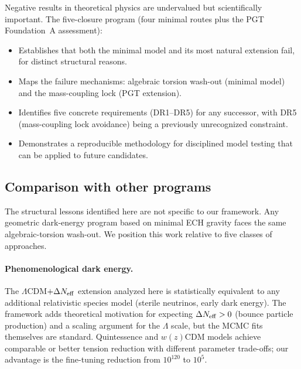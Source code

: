 \documentclass[aps,prd,twocolumn,superscriptaddress,showpacs,preprintnumbers,
  nofootinbib,longbibliography,floatfix]{revtex4-2}
\newcommand{\Neff}{N_{\rm eff}}
\begin{document}
Negative results in theoretical physics are undervalued but scientifically
important. The five-closure program (four minimal routes plus the PGT
Foundation~A assessment):
\begin{itemize}[leftmargin=*]
  \item Establishes that both the minimal model and its most natural
    extension fail, for distinct structural reasons.
  \item Maps the failure mechanisms: algebraic torsion wash-out
    (minimal model) and the mass-coupling lock (PGT extension).
  \item Identifies five concrete requirements (DR1--DR5) for any
    successor, with DR5 (mass-coupling lock avoidance) being a
    previously unrecognized constraint.
  \item Demonstrates a reproducible methodology for disciplined model
    testing that can be applied to future candidates.
\end{itemize}

\subsection{Comparison with other programs}\label{sec:related}

The structural lessons identified here are not specific to our framework.
Any geometric dark-energy program based on minimal ECH gravity faces the
same algebraic-torsion wash-out. We position this work relative to five
classes of approaches.

\paragraph{Phenomenological dark energy.}
The $\Lambda$CDM$+\Delta\Neff$ extension analyzed here is statistically
equivalent to any additional relativistic species model (sterile
neutrinos, early dark energy). The framework adds theoretical
motivation for expecting $\Delta\Neff > 0$ (bounce particle production)
and a scaling argument for the $\Lambda$ scale, but the MCMC fits
themselves are standard. Quintessence and $w(z)$CDM models achieve
comparable or better tension reduction with different parameter
trade-offs; our advantage is the fine-tuning reduction from $10^{120}$
to $10^5$.
\end{document}
